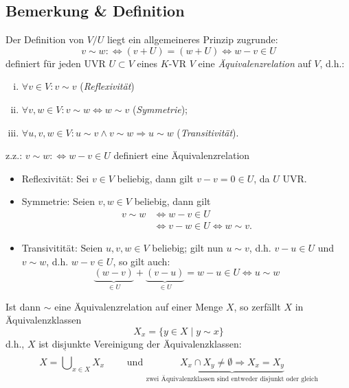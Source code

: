  \subsection{Bemerkung \& Definition}
 	\begin{Definition}[Äquivalenzrelation]
 		Der Definition von $ V/U $ liegt ein allgemeineres Prinzip zugrunde:
 		\[
 			v\sim w :\Leftrightarrow (v+U)= (w+U) \Leftrightarrow w-v \in U
 		\]
 		definiert für jeden UVR $ U\subset V $ eines $ K $-VR $ V $ eine \emph{Äquivalenzrelation} auf $ V $, d.h.:
 		\begin{enumerate}[(i)]
 			\item $ \forall v\in V: v\sim v $ (\emph{Reflexivität})
 			\item $ \forall v,w\in V: v\sim w\Leftrightarrow w\sim v $ (\emph{Symmetrie});
 			\item $ \forall u,v,w\in V: u\sim v\land v\sim w\Rightarrow u\sim w $ (\emph{Transitivität}).
 		\end{enumerate}
 	\end{Definition}

 	z.z.: $ v\sim w:\Leftrightarrow w-v\in U $ definiert eine Äquivalenzrelation

 	\begin{itemize}
 		\item Reflexivität: Sei $ v\in V $ beliebig, dann gilt $ v-v=0\in U $, da $ U $ UVR.
 		\item Symmetrie: Seien $ v,w\in V $ beliebig, dann gilt
 		      \begin{align*}
 		      	v\sim w & \Leftrightarrow w-v\in U                          \\
 		      	        & \Leftrightarrow v-w\in U \Leftrightarrow w\sim v.
 		      \end{align*}
 		\item Transivitität: Seien $ u,v,w\in V $ beliebig; gilt nun
 		      $u\sim v$, d.h. $v-u\in U$ und $v\sim w$, d.h. $w-v\in U$, so gilt auch:
 		      \[
 		      	\underbrace{(w-v)}_{\in U}+\underbrace{(v-u)}_{\in U}= w-u\in U \Leftrightarrow u\sim w
 		      \]
 	\end{itemize}

 	Ist dann $ \sim $ eine Äquivalenzrelation auf einer Menge $ X $, so zerfällt $ X $ in Äquivalenzklassen
 	\[
 		X_x = \{y\in X\mid y\sim x\}
 	\]
 	d.h., $ X $ ist disjunkte Vereinigung der Äquivalenzklassen:
 	\[
 		X = \dot{\bigcup}_{x\in X}X_x \qquad\text{ und } \underbrace{X_x \cap X_y \neq \emptyset \Rightarrow X_x = X_y}_{\text{zwei Äquivalenzklassen sind entweder disjunkt oder gleich}}
 	\]

